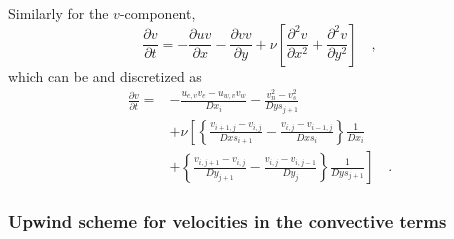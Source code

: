 \documentclass[12pt,a4paper,fleqn]{article}
\begin{document}
Similarly for the $v$-component,
\begin{equation} \label{eq:convective-diffusive-v}
\frac{\partial v}{\partial t} = -\frac{\partial uv}{\partial x} -\frac{\partial vv}{\partial y} + \nu\left[\frac{\partial^2v}{\partial x^2} + \frac{\partial^2v}{\partial y^2}\right] \quad ,
\end{equation}
which can be and discretized as
\begin{align}\label{eq:discretized_convective-diffusive-v}
    \frac{\partial v}{\partial t} =
    {}& - \frac{u_{e,v} v_e - u_{w,v} v_w}{Dx_i} - \frac{v_n^2 - v_s^2}{Dys_{j+1}} \nonumber\\
    & + \nu\left[
    \left\{
    \frac{v_{i+1,j}-v_{i,j}}{Dxs_{i+1}}
    - \frac{v_{i,j}-v_{i-1,j}}{Dxs_i}
    \right\}
    \frac{1}{Dx_i}
    \right.\nonumber\\
    & \left. + \left\{
    \frac{v_{i,j+1}-v_{i,j}}{Dy_{j+1}}
    - \frac{v_{i,j}-v_{i,j-1}}{Dy_j}
    \right\}
    \frac{1}{Dys_{j+1}}
    \right] \quad .
\end{align}

\subsubsection{Upwind scheme for velocities in the convective terms}
\end{document}

